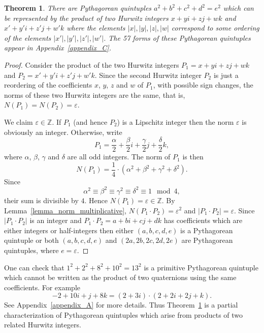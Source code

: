 \documentclass[12pt,table]{article}
\newtheorem{theorem}{Theorem}[section]
\theoremstyle{definition}
\theoremstyle{remark}
\newcommand{\Zzz}{\mathbb Z}
\numberwithin{equation}{section}
\begin{document}
\begin{theorem}
\label{theorem_as_products}
There are Pythagorean quintuples 
$a^2 + b^2 +c^2 +d^2 = e^2$ which can be represented
by the product of two Hurwitz integers
$x + yi + zj + wk$ and
$x' + y'i + z'j + w'k$
where
the elements
$|x|, |y|, |z|, |w|$ correspond
to some ordering of the elements
$|x'|, |y'|, |z'|, |w'|$.
The 57 forms of these Pythagorean quintuples 
appear in Appendix~\ref{appendix_C}.
\end{theorem}
\begin{proof}
Consider the product of the two Hurwitz integers
$P_1 = x + yi + zj + wk$ and
$P_2 = x' + y'i + z'j + w'k$.  
Since the second Hurwitz integer $P_2$ 
is just a reordering of
the coefficients $x$, $y$, $z$ and $w$ of $P_1$, 
with possible sign changes,
the norms  of these two Hurwitz integers
are the same, that is,
$N(P_1) = N(P_2) = \varepsilon$.


We claim $\varepsilon \in \Zzz$.  If $P_1$ (and hence $P_2$)
is a Lipschitz integer then 
the norm $\varepsilon$ is obviously an integer.
Otherwise, write 
$$
  P_1 = \frac{\alpha}{2} + \frac{\beta}{2} i + 
        \frac{\gamma}{2} j + \frac{\delta}{2} k,
$$
where
$\alpha$, $\beta$, $\gamma$ and $\delta$ are all odd integers.
The norm of $P_1$ is then
$$
     N(P_1) = \frac{1}{4} \cdot 
              (\alpha^2 + \beta^2 + \gamma^2 + \delta^2).
$$
Since
$$
  \alpha^2 \equiv \beta^2 \equiv \gamma^2 \equiv \delta^2 \equiv 1 \mod 4,
$$
their sum is divisible by $4$.
Hence $N(P_1) = \varepsilon \in \Zzz$.
By Lemma~\ref{lemma_norm_multiplicative},
$N(P_1 \cdot P_2) = \varepsilon^2$
and 
$|P_1 \cdot P_2| = \varepsilon$.
Since $|P_1 \cdot P_2|$ is an integer and 
$P_1 \cdot P_2 = a + bi + cj + dk$ has
coefficients which are either integers or half-integers 
then
either
$(a,b,c,d,e)$ is a Pythagorean quintuple
or
both
$(a,b,c,d,e)$ and
$(2a,2b,2c,2d,2e)$ are Pythagorean quintuples,
where
$e = \varepsilon$.
\end{proof}





One can check that 
$1^2+ 2^2+ 8^2+ 10^2  = 13^2$
is a primitive Pythagorean quintuple which
cannot be written as the product of two quaternions
using the same coefficients.
For example
$$
  -2 + 10 i + j + 8k = (2 + 3i) \cdot (2 + 2i + 2j + k).
$$
See Appendix~\ref{appendix_A} for more details.
Thus Theorem~\ref{theorem_as_products} 
is a partial characterization of Pythagorean quintuples 
which arise from products of two related Hurwitz integers.
\end{document}
